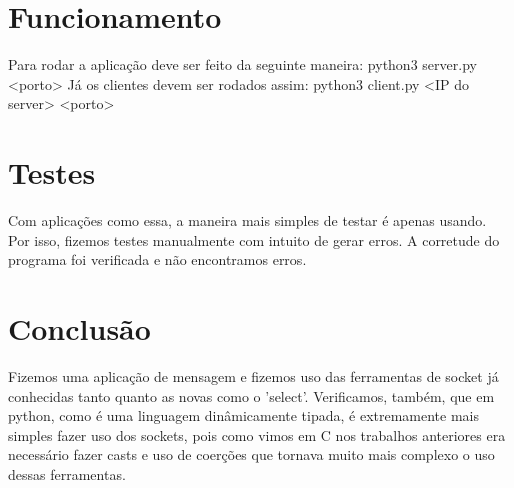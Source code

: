 \documentclass[10pt]{article}
\begin{document}
	\section{Funcionamento}
	Para rodar a aplicação deve ser feito da seguinte maneira:
	\newline python3 server.py <porto>
	\newline Já os clientes devem ser rodados assim:
	\newline python3 client.py <IP do server> <porto>
	\section{Testes}
	Com aplicações como essa, a maneira mais simples de testar é apenas usando. Por isso, fizemos testes manualmente com intuito de gerar erros. A corretude do programa foi verificada e não encontramos erros.
	\section{Conclusão}
	Fizemos uma aplicação de mensagem e fizemos uso das ferramentas de socket já conhecidas tanto quanto as novas como o 'select'. Verificamos, também, que em python, como é uma linguagem dinâmicamente tipada, é extremamente mais simples fazer uso dos sockets, pois como vimos em C nos trabalhos anteriores era necessário fazer casts e uso de coerções que tornava muito mais complexo o uso dessas ferramentas.
\end{document}
